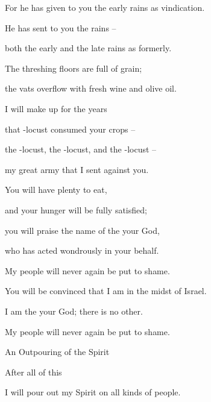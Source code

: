 {\par }{\Q For
he has given
to you the
early rains
as vindication.
\par }{\Q He has sent
to you the rains
–
\par }{\Q both the early
and the late rains
as formerly.
\par }{\Q {}The threshing floors
are full
of grain;
\par }{\Q the vats
overflow
with fresh wine
and olive oil.
\par }{\Q {}I will make up
for the years
\par }{\Q that
{}-locust
consumed your crops –
\par }{\Q the
{}-locust, the
{}-locust, and the
{}-locust –
\par }{\Q my great army that I sent against you.
\par }{\Q {}You will have plenty
to eat,
\par }{\Q and your hunger will be fully satisfied;
\par }{\Q you will praise
the name
of the {}
your God,
\par }{\Q who
has acted
wondrously
in your behalf.
\par }{\Q My people
will never
again be put to shame.
\par }{\Q {}You will be convinced
that
I am
in the midst
of Israel.
\par }{\Q I
am
the {}
your God;
there is no
other.
\par }{\Q My people
will never
again
be put to shame.
\par }{\SH An Outpouring of the Spirit
\par }{\Q {} After
all of this
\par }{\Q I will pour
out my Spirit
on
all
kinds
of people.

}
